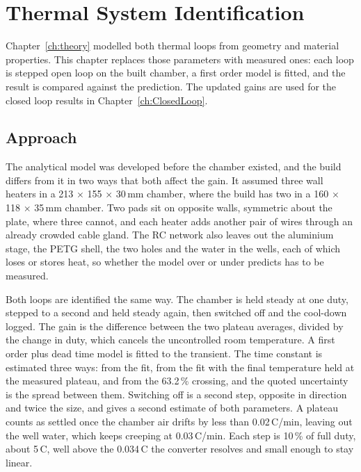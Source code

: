 \chapter{Thermal System Identification}
\label{ch:thermalID}

Chapter~\ref{ch:theory} modelled both thermal loops from geometry and material properties. This chapter replaces those parameters with measured ones: each loop is stepped open loop on the built chamber, a first order model is fitted, and the result is compared against the prediction. The updated gains are used for the closed loop results in Chapter~\ref{ch:ClosedLoop}.

\section{Approach}
\label{sec:sysid-approach}

The analytical model was developed before the chamber existed, and the build differs from it in two ways that both affect the gain. It assumed three wall heaters in a 213 $\times$ 155 $\times$ 30\,mm chamber, where the build has two in a 160 $\times$ 118 $\times$ 35\,mm chamber. Two pads sit on opposite walls, symmetric about the plate, where three cannot, and each heater adds another pair of wires through an already crowded cable gland. The RC network also leaves out the aluminium stage, the PETG shell, the two holes and the water in the wells, each of which loses or stores heat, so whether the model over or under predicts has to be measured.

Both loops are identified the same way. The chamber is held steady at one duty, stepped to a second and held steady again, then switched off and the cool-down logged. The gain is the difference between the two plateau averages, divided by the change in duty, which cancels the uncontrolled room temperature. A first order plus dead time model is fitted to the transient. The time constant is estimated three ways: from the fit, from the fit with the final temperature held at the measured plateau, and from the 63.2\,\% crossing, and the quoted uncertainty is the spread between them. Switching off is a second step, opposite in direction and twice the size, and gives a second estimate of both parameters. A plateau counts as settled once the chamber air drifts by less than 0.02\,\textdegree{}C/min, leaving out the well water, which keeps creeping at 0.03\,\textdegree{}C/min. Each step is 10\,\% of full duty, about 5\,\textdegree{}C, well above the 0.034\,\textdegree{}C the converter resolves and small enough to stay linear.

